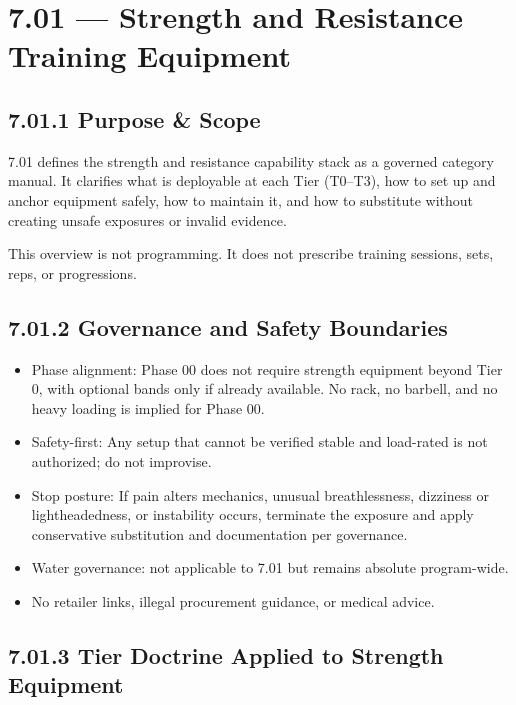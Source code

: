 \documentclass[10pt]{article}
\begin{document}
\section*{7.01 — Strength and Resistance Training Equipment}
{}

\subsection*{7.01.1 Purpose \& Scope}
{}

7.01 defines the strength and resistance capability stack as a governed category manual. It clarifies what is deployable at each Tier (T0–T3), how to set up and anchor equipment safely, how to maintain it, and how to substitute without creating unsafe exposures or invalid evidence.

This overview is not programming. It does not prescribe training sessions, sets, reps, or progressions.

\subsection*{7.01.2 Governance and Safety Boundaries}
{}

\begin{itemize}
\item Phase alignment: Phase 00 does not require strength equipment beyond Tier 0, with optional bands only if already available. No rack, no barbell, and no heavy loading is implied for Phase 00.
\item Safety-first: Any setup that cannot be verified stable and load-rated is not authorized; do not improvise.
\item Stop posture: If pain alters mechanics, unusual breathlessness, dizziness or lightheadedness, or instability occurs, terminate the exposure and apply conservative substitution and documentation per governance.
\item Water governance: not applicable to 7.01 but remains absolute program-wide.
\item No retailer links, illegal procurement guidance, or medical advice.
\end{itemize}

\subsection*{7.01.3 Tier Doctrine Applied to Strength Equipment}
{}
\end{document}
